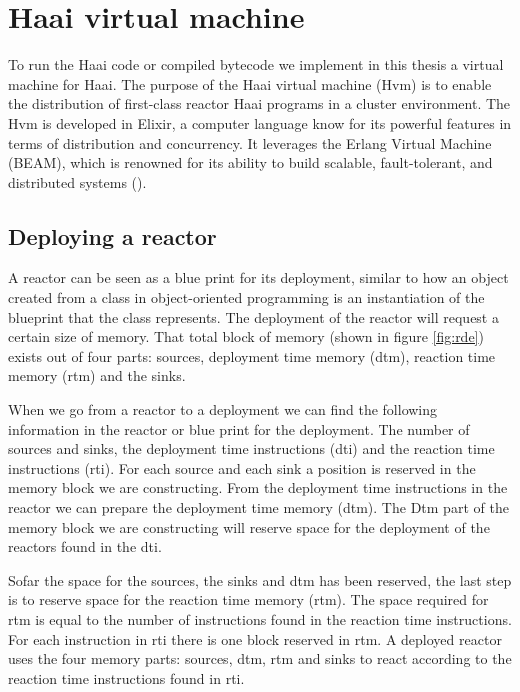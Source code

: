 \documentclass[a4paper]{book}
\begin{document}
\section{Haai virtual machine} \label{sec:Hvm}
To run the Haai code or compiled bytecode we implement in this thesis a virtual machine for Haai. The purpose of the Haai virtual machine (Hvm) is to enable the distribution of first-class reactor Haai programs in a cluster environment. The Hvm is developed in Elixir, a computer language know for its powerful features in terms of distribution and concurrency. It leverages the Erlang Virtual Machine (BEAM), which is renowned for its ability to build scalable, fault-tolerant, and distributed systems (\cite{10.5555/1951582}).

\subsection{Deploying a reactor} \label{sec:dar}
A reactor can be seen as a blue print for its deployment, similar to how an object created from a class in object-oriented programming is an instantiation of the blueprint that the class represents. The deployment of the reactor will request a certain size of memory. 
That total block of memory (shown in figure \ref{fig:rde}) exists out of four parts: sources, deployment time memory (dtm), reaction time memory (rtm) and the sinks. 

When we go from a reactor to a deployment we can find the following information in the reactor or blue print for the deployment. The number of sources and sinks, the deployment time instructions (dti) and the reaction time instructions (rti). For each source and each sink a position is reserved in the memory block we are constructing. From the deployment time instructions in the reactor we can prepare the deployment time memory (dtm). The Dtm part of the memory block we are constructing will reserve space for the deployment of the reactors found in the dti. 

Sofar the space for the sources, the sinks and dtm has been reserved, the last step is to reserve space for the reaction time memory (rtm). The space required for rtm is equal to the number of instructions found in the reaction time instructions. For each instruction in rti there is one block reserved in rtm. A deployed reactor uses the four memory parts: sources, dtm, rtm and sinks to react according to the reaction time instructions found in rti.
\end{document}
